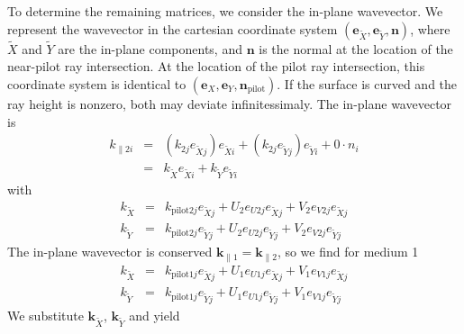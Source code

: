 \documentclass[12pt,a4paper,twoside,openright,BCOR10mm,headsepline,titlepage,abstracton,chapterprefix,final]{scrreprt}
\newcommand\Vector[1]{{\mathbf{#1}}}
\newcommand\wavenumber{k}
\newcommand\Wavevector{\Vector{\wavenumber}}
\newcommand\pilot{\textrm{pilot}}
\begin{document}
To determine the remaining matrices, we consider the in-plane wavevector.
We represent the wavevector in the cartesian coordinate system
$(\Vector{e}_{\tilde{X}}, \Vector{e}_{\tilde{Y}}, \Vector{n})$,
where $\tilde{X}$ and $\tilde{Y}$ are the in-plane components, 
and $\Vector{n}$ is the normal at the location of the near-pilot ray intersection.
At the location of the pilot ray intersection, this coordinate system is identical to
$(\Vector{e}_{X}, \Vector{e}_{Y}, \Vector{n}_{\pilot})$.
If the surface is curved and the ray height is nonzero, both may deviate infinitessimaly.
The in-plane wavevector is
\begin{eqnarray}
 \wavenumber_{\parallel2i} &=& (\wavenumber_{2j} e_{\tilde{X}j}) e_{\tilde{X}i} + (\wavenumber_{2j} e_{\tilde{Y}j}) e_{\tilde{Y}i} + 0 \cdot n_i
 \\
 &=& \wavenumber_{\tilde{X}} e_{\tilde{X}i} + \wavenumber_{\tilde{Y}} e_{\tilde{Y}i}
\end{eqnarray}
with
\begin{eqnarray}
 \wavenumber_{\tilde{X}} &=& \wavenumber_{\pilot 2 j} e_{\tilde{X}j} + U_2 e_{U2j} e_{\tilde{X}j} + V_2 e_{V2j} e_{\tilde{X}j}
 \\
 \wavenumber_{\tilde{Y}} &=& \wavenumber_{\pilot 2 j} e_{\tilde{Y}j} + U_2 e_{U2j} e_{\tilde{Y}j} + V_2 e_{V2j} e_{\tilde{Y}j}
\end{eqnarray}
The in-plane wavevector is conserved $\Wavevector_{\parallel1} = \Wavevector_{\parallel2}$, 
so we find for medium 1
\begin{eqnarray}
 \wavenumber_{\tilde{X}} &=& \wavenumber_{\pilot 1 j} e_{\tilde{X}j} + U_1 e_{U1j} e_{\tilde{X}j} + V_1 e_{V1j} e_{\tilde{X}j}
 \\
 \wavenumber_{\tilde{Y}} &=& \wavenumber_{\pilot 1 j} e_{\tilde{Y}j} + U_1 e_{U1j} e_{\tilde{Y}j} + V_1 e_{V1j} e_{\tilde{Y}j}
\end{eqnarray}
We substitute $\Wavevector_{\tilde{X}}$, $\Wavevector_{\tilde{Y}}$ and yield
\end{document}
